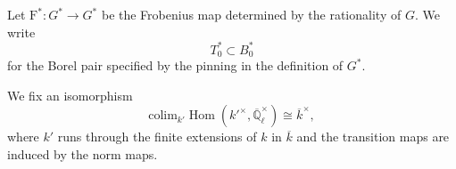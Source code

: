 \documentclass[12pt,a4paper]{article}
\DeclareMathOperator{\Hom}{Hom}
\newcommand{\mb}{\mathbb}
\newcommand{\mr}{\mathrm}
\newcommand{\ol}{\overline}
\newcommand{\wh}{\widehat}
\begin{document}
Let $\mr{F}^* \colon G^* \to G^*$ 
be the Frobenius map determined by the rationality of $G$.
We write
\begin{equation}
	T^{*}_0 \subset B_0^{*} 
\end{equation}
for the Borel pair specified by
the pinning in the definition of $G^{*}$. 



We fix an isomorphism
\begin{equation}\label{en:unityiso}
\mathrm{colim}_{k'} \Hom (k'^{\times},\ol{\mb{Q}}_{\ell}^{\times}) \cong \ol{k}^{\times} , 
\end{equation}
where $k'$ runs through the finite extensions of $k$ in $\ol{k}$ and the transition maps are induced by the norm maps.
\end{document}
